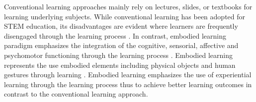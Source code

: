 \documentclass[12pt]{article}
\begin{document}
Conventional learning approaches mainly rely on lectures, slides, or textbooks for learning underlying subjects. While conventional learning has been adopted for STEM education, its disadvantages are evident where learners are frequently disengaged through the learning process \cite{freeman2014active}.  In contrast, embodied learning paradigm emphasizes the integration of the cognitive, sensorial, affective and psychomotor functioning through the learning process \cite{jusslin2022embodied}. Embodied learning represents the use embodied elements including  physical objects and human gestures through learning \cite{stolz2015embodied,macedonia2019embodied,munro2018principles}. Embodied learning emphasizes the use of experiential learning through the learning process thus to achieve better learning outcomes in contrast to the conventional learning approach. 


\end{document}
